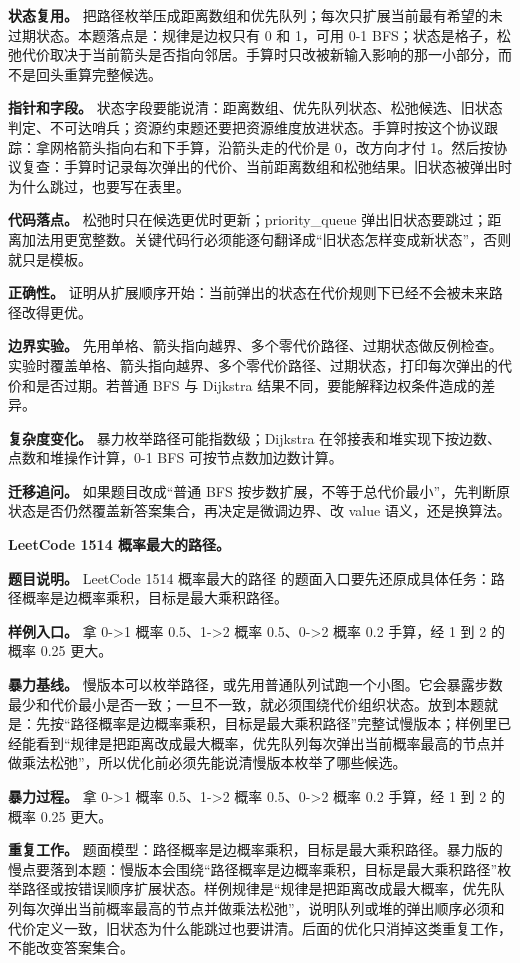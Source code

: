 \textbf{状态复用。} 把路径枚举压成距离数组和优先队列；每次只扩展当前最有希望的未过期状态。本题落点是：规律是边权只有 0 和 1，可用 0-1 BFS；状态是格子，松弛代价取决于当前箭头是否指向邻居。手算时只改被新输入影响的那一小部分，而不是回头重算完整候选。

\textbf{指针和字段。} 状态字段要能说清：距离数组、优先队列状态、松弛候选、旧状态判定、不可达哨兵；资源约束题还要把资源维度放进状态。手算时按这个协议跟踪：拿网格箭头指向右和下手算，沿箭头走的代价是 0，改方向才付 1。然后按协议复查：手算时记录每次弹出的代价、当前距离数组和松弛结果。旧状态被弹出时为什么跳过，也要写在表里。

\textbf{代码落点。} 松弛时只在候选更优时更新；priority\_queue 弹出旧状态要跳过；距离加法用更宽整数。关键代码行必须能逐句翻译成“旧状态怎样变成新状态”，否则就只是模板。

\textbf{正确性。} 证明从扩展顺序开始：当前弹出的状态在代价规则下已经不会被未来路径改得更优。

\textbf{边界实验。} 先用单格、箭头指向越界、多个零代价路径、过期状态做反例检查。实验时覆盖单格、箭头指向越界、多个零代价路径、过期状态，打印每次弹出的代价和是否过期。若普通 BFS 与 Dijkstra 结果不同，要能解释边权条件造成的差异。

\textbf{复杂度变化。} 暴力枚举路径可能指数级；Dijkstra 在邻接表和堆实现下按边数、点数和堆操作计算，0-1 BFS 可按节点数加边数计算。

\textbf{迁移追问。} 如果题目改成“普通 BFS 按步数扩展，不等于总代价最小”，先判断原状态是否仍然覆盖新答案集合，再决定是微调边界、改 value 语义，还是换算法。

\noindent\textbf{LeetCode 1514 概率最大的路径。}

\textbf{题目说明。} LeetCode 1514 概率最大的路径 的题面入口要先还原成具体任务：路径概率是边概率乘积，目标是最大乘积路径。

\textbf{样例入口。} 拿 0->1 概率 0.5、1->2 概率 0.5、0->2 概率 0.2 手算，经 1 到 2 的概率 0.25 更大。

\textbf{暴力基线。} 慢版本可以枚举路径，或先用普通队列试跑一个小图。它会暴露步数最少和代价最小是否一致；一旦不一致，就必须围绕代价组织状态。放到本题就是：先按“路径概率是边概率乘积，目标是最大乘积路径”完整试慢版本；样例里已经能看到“规律是把距离改成最大概率，优先队列每次弹出当前概率最高的节点并做乘法松弛”，所以优化前必须先能说清慢版本枚举了哪些候选。

\textbf{暴力过程。} 拿 0->1 概率 0.5、1->2 概率 0.5、0->2 概率 0.2 手算，经 1 到 2 的概率 0.25 更大。

\textbf{重复工作。} 题面模型：路径概率是边概率乘积，目标是最大乘积路径。暴力版的慢点要落到本题：慢版本会围绕“路径概率是边概率乘积，目标是最大乘积路径”枚举路径或按错误顺序扩展状态。样例规律是“规律是把距离改成最大概率，优先队列每次弹出当前概率最高的节点并做乘法松弛”，说明队列或堆的弹出顺序必须和代价定义一致，旧状态为什么能跳过也要讲清。后面的优化只消掉这类重复工作，不能改变答案集合。

